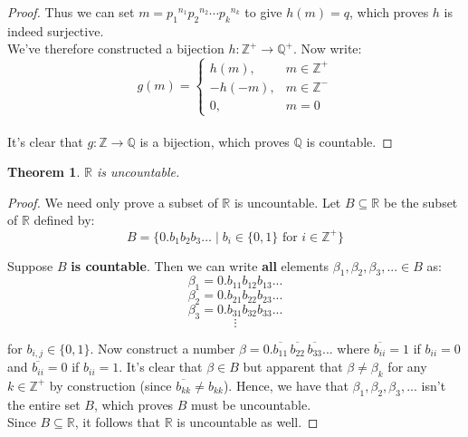 \documentclass[12pt, a4paper, titlepage, twoside]{article}
\newcommand*{\Z}{\mathbb{Z}}
\newcommand*{\Q}{\mathbb{Q}}
\newcommand*{\R}{\mathbb{R}}
\newtheorem*{theorem*}{Theorem}
\begin{document}
\begin{pf}
\begin{proof}
			Thus we can set $m = {p_1}^{n_1} {p_2}^{n_2} \cdots {p_k}^{n_k}$ to give $h(m) = q$, which proves $h$ is indeed surjective.\\
			
			We've therefore constructed a bijection $h : \Z^+ \to \Q^+$. Now write:
			\[ g(m) = \begin{cases} h(m), & m \in \Z^+ \\ -h(-m), & m \in \Z^- \\ 0, & m = 0 \end{cases} \]
			
			\paragraph{}
			It's clear that $g : \Z \to \Q$ is a bijection, which proves $\Q$ is countable.
		\end{proof}
	\end{pf}
	
	\hfill
	
	\begin{pf}
		\label{apA:r-uncount}
		\begin{theorem*}
			$\R$ is uncountable.
		\end{theorem*}

		\tcbline		
		
		\begin{proof}
			We need only prove a subset of $\R$ is uncountable. Let $B \subseteq \R$ be the subset of $\R$ defined by:
			\[ B = \{ 0.b_1b_2b_3... \; \vert \; b_i \in \{0,1\} \text{ for } i \in \Z^+  \} \]
			
			Suppose $B$ \textbf{is countable}. Then we can write \textbf{all} elements $\beta_1, \beta_2, \beta_3, ... \in B$ as:
			\[ \beta_1 = 0.b_{11}b_{12}b_{13}... \]
			\[ \beta_2 = 0.b_{21}b_{22}b_{23}... \]
			\[ \beta_3 = 0.b_{31}b_{32}b_{33}... \]
			\[ \vdots \]
			
			for $b_{i,j} \in \{0, 1\}$. Now construct a number $\beta = 0.\overline{b_{11}} \, \overline{b_{22}} \, \overline{b_{33}}...$
			where $\overline{b_{ii}} = 1$ if $b_{ii} = 0$ and $\overline{b_{ii}} = 0$ if $b_{ii} = 1$. It's clear that $\beta \in B$ but apparent
			that $\beta \neq \beta_k$ for any $k \in \Z^+$ by construction (since $\overline{b_{kk}} \neq b_{kk}$). Hence, we have
			that $\beta_1, \beta_2, \beta_3, ...$ isn't the entire set $B$, which proves $B$ must be uncountable.\\
			
			Since $B \subseteq \R$, it follows that $\R$ is uncountable as well.
		\end{proof}
	\end{pf}
	
\end{document}
